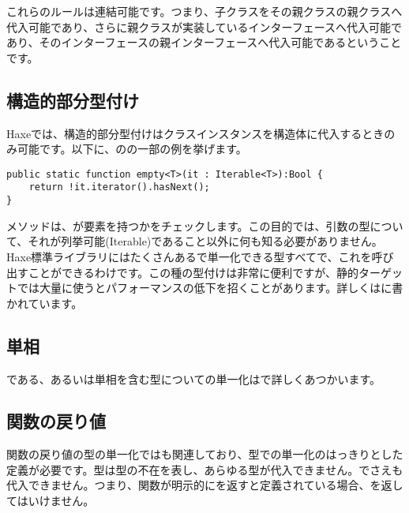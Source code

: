 これらのルールは連結可能です。つまり、子クラスをその親クラスの親クラスへ代入可能であり、さらに親クラスが実装しているインターフェースへ代入可能であり、そのインターフェースの親インターフェースへ代入可能であるということです。


\subsection{構造的部分型付け}
\label{type-system-structural-subtyping}


Haxeでは、構造的部分型付けはクラスインスタンスを構造体に代入するときのみ可能です。以下に、のの一部の例を挙げます。

\begin{lstlisting}
public static function empty<T>(it : Iterable<T>):Bool {
	return !it.iterator().hasNext();
}
\end{lstlisting}

メソッドは、が要素を持つかをチェックします。この目的では、引数の型について、それが列挙可能(Iterable)であること以外に何も知る必要がありません。Haxe標準ライブラリにはたくさんあるで単一化できる型すべてで、これを呼び出すことができるわけです。この種の型付けは非常に便利ですが、静的ターゲットでは大量に使うとパフォーマンスの低下を招くことがあります。詳しくはに書かれています。


\subsection{単相}
\label{type-system-monomorphs}

である、あるいは単相を含む型についての単一化はで詳しくあつかいます。

\subsection{関数の戻り値}
\label{type-system-unification-function-return}

関数の戻り値の型の単一化ではも関連しており、型での単一化のはっきりとした定義が必要です。型は型の不在を表し、あらゆる型が代入できません。でさえも代入できません。つまり、関数が明示的にを返すと定義されている場合、を返してはいけません。

